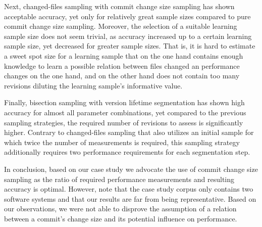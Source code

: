 Next, changed-files sampling with commit change size sampling has shown
acceptable accuracy, yet only for relatively great sample sizes compared to
pure commit change size sampling. Moreover, the selection of a suitable
learning sample size does not seem trivial, as accuracy increased up to a
certain learning sample size, yet decreased for greater sample sizes. That is,
it is hard to estimate a sweet spot size for a learning sample that on the one
hand contains enough knowledge to learn a possible relation between files
changed an performance changes on the one hand, and on the other hand does not
contain too many revisions diluting the learning sample's informative value. 

Finally, bisection sampling with version lifetime segmentation has shown high
accuracy for almost all parameter combinations, yet compared to the previous
sampling strategies, the required number of revisions to assess is
significantly higher. Contrary to changed-files sampling that also utilizes an
initial sample for which twice the number of measurements is required, this
sampling strategy additionally requires two performance requirements for each
segmentation step.

In conclusion, based on our case study we advocate the use of commit change
size sampling as the ratio of required performance measurements and resulting
accuracy is optimal. However, note that the case study corpus only contains two
software systems and that our results are far from being representative. Based
on our observations, we were not able to disprove the assumption of a relation
between a commit’s change size and its potential influence on performance.
